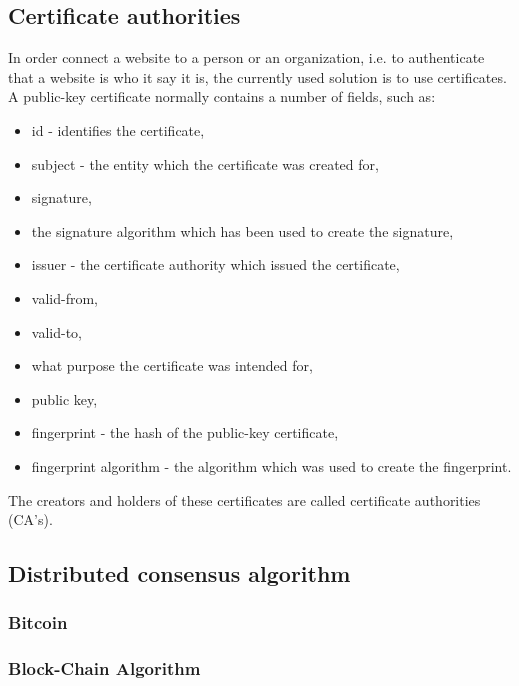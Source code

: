 \documentclass{acm_proc_article-sp}
\begin{document}
\subsection{Certificate authorities}
In order connect a website to a person or an organization, i.e. to authenticate that a website is who it say it is, the currently used solution is to use certificates. A public-key certificate normally contains a number of fields, such as: 
\begin{itemize}[noitemsep]
    \item id - identifies the certificate,
    \item subject - the entity which the certificate was created for, 
    \item signature,
    \item the signature algorithm which has been used to create the signature,
    \item issuer - the certificate authority which issued the certificate,
    \item valid-from,
    \item valid-to,
    \item what purpose the certificate was intended for,
    \item public key, 
    \item fingerprint - the hash of the public-key certificate,
    \item fingerprint algorithm - the algorithm which was used to create the fingerprint.
\end{itemize}
The creators and holders of these certificates are called certificate authorities (CA's). 

\subsection{Distributed consensus algorithm}

\subsubsection{Bitcoin}
\subsubsection{Block-Chain Algorithm}
\end{document}
